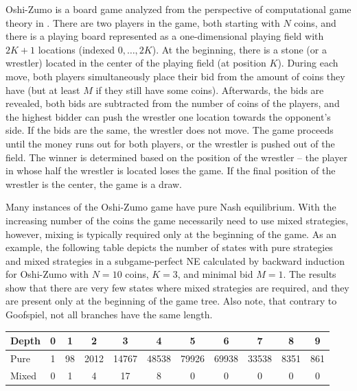 Oshi-Zumo is a board game analyzed from the perspective of computational game theory in \cite{buro2003}.
There are two players in the game, both starting with $N$ coins, and there is a playing board represented as a one-dimensional playing field with $2K+1$ locations (indexed $0, \ldots, 2K$).
At the beginning, there is a stone (or a wrestler) located in the center of the playing field (\ie at position $K$).
During each move, both players simultaneously place their bid from the amount of coins they have (but at least $M$ if they still have some coins).
Afterwards, the bids are revealed, both bids are subtracted from the number of coins of the players, and the highest bidder can push the wrestler one location towards the opponent's side.
If the bids are the same, the wrestler does not move.
The game proceeds until the money runs out for both players, or the wrestler is pushed out of the field.
The winner is determined based on the position of the wrestler -- the player in whose half the wrestler is located loses the game.
If the final position of the wrestler is the center, the game is a draw.

Many instances of the Oshi-Zumo game have pure Nash equilibrium.
With the increasing number of the coins the game necessarily need to use mixed strategies, however, mixing is typically required only at the beginning of the game.
As an example, the following table depicts the number of states with pure strategies and mixed strategies in a subgame-perfect NE calculated by backward induction for Oshi-Zumo with $N=10$ coins, $K=3$, and minimal bid $M=1$. The results show that there are very few states where mixed strategies are required, and they are present only at the beginning of the game tree. Also note, that contrary to Goofspiel, not all branches have the same length.

\vspace{0.1cm}

\begin{center}
\small
\begin{tabular}{|l|c|c|c|c|c|c|c|c|c|c|}
\hline Depth & 0 & 1 & 2 & 3 & 4 & 5 & 6 & 7 & 8 & 9\\
\hline Pure  & 1 & 98 & 2012 & 14767 & 48538 & 79926 & 69938 & 33538 & 8351 & 861\\
\hline Mixed & 0 &  1 &  4 &  17 & 8 & 0 & 0 & 0 & 0 & 0 \\
\hline
\end{tabular}
\end{center}

